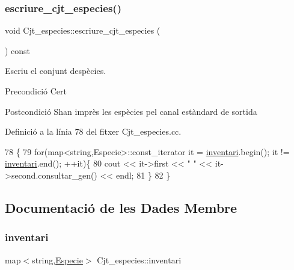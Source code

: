 \subsubsection{\texorpdfstring{escriure\+\_\+cjt\+\_\+especies()}{escriure\_cjt\_especies()}}
{\footnotesize\ttfamily void Cjt\+\_\+especies\+::escriure\+\_\+cjt\+\_\+especies (\begin{DoxyParamCaption}{ }\end{DoxyParamCaption}) const}



Escriu el conjunt d\textquotesingle{}espècies. 

\begin{DoxyPrecond}{Precondició}
Cert 
\end{DoxyPrecond}
\begin{DoxyPostcond}{Postcondició}
S\textquotesingle{}han imprès les espècies pel canal estàndard de sortida 
\end{DoxyPostcond}


Definició a la línia 78 del fitxer Cjt\+\_\+especies.\+cc.


\begin{DoxyCode}
78                                               \{
79     \textcolor{keywordflow}{for}(map<string,Especie>::const\_iterator it = \hyperlink{class_cjt__especies_aa253bc335c8c8176b8ece5c49a15c5f3}{inventari}.begin(); it != 
      \hyperlink{class_cjt__especies_aa253bc335c8c8176b8ece5c49a15c5f3}{inventari}.end(); ++it)\{
80         cout << it->first << \textcolor{stringliteral}{" "} << it->second.consultar\_gen() << endl;
81     \}
82 \}
\end{DoxyCode}


\subsection{Documentació de les Dades Membre}
\mbox{\label{class_cjt__especies_aa253bc335c8c8176b8ece5c49a15c5f3}} 
\subsubsection{\texorpdfstring{inventari}{inventari}}
{\footnotesize\ttfamily map$<$string,\hyperlink{class_especie}{Especie}$>$ Cjt\+\_\+especies\+::inventari\hspace{0.3cm}{\ttfamily [private]}}



